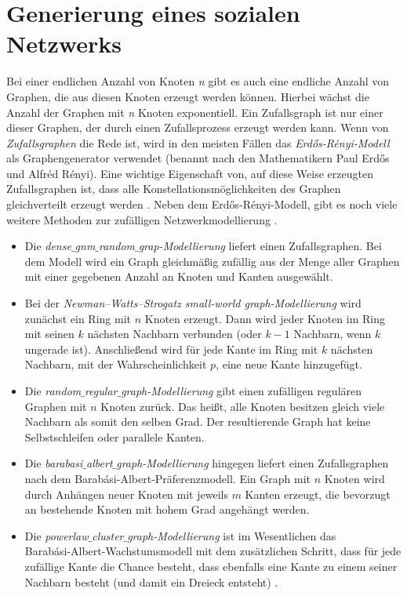 \section{Generierung eines sozialen Netzwerks} 
Bei einer endlichen Anzahl von Knoten \textit{n} gibt es auch eine endliche Anzahl von Graphen, die aus diesen Knoten erzeugt werden können. Hierbei wächst die Anzahl der Graphen mit \textit{n} Knoten exponentiell.
Ein Zufallsgraph ist nur einer dieser Graphen, der durch einen Zufallsprozess erzeugt werden kann.
Wenn von \textit{Zufallsgraphen} die Rede ist, wird in den meisten Fällen das \textit{Erdős-Rényi-Modell} als Graphengenerator verwendet (benannt nach den Mathematikern Paul Erdős und Alfréd Rényi). Eine wichtige Eigenschaft von, auf diese Weise erzeugten Zufallsgraphen ist, dass alle Konstellationsmöglichkeiten des Graphen gleichverteilt erzeugt werden \cite{Generators}.
Neben dem Erdős-Rényi-Modell, gibt es noch viele weitere Methoden zur zufälligen Netzwerkmodellierung \cite{Generators}.
\begin{itemize}
    \item Die \textit{dense$\_$gnm$\_$random$\_$grap-Modellierung} liefert einen Zufallsgraphen.
    Bei dem Modell wird ein Graph gleichmäßig zufällig aus der Menge aller Graphen mit einer gegebenen Anzahl an Knoten und Kanten ausgewählt.
    \item Bei der \textit{Newman–Watts–Strogatz small-world graph-Modellierung} wird zunächst ein Ring mit $n$ Knoten erzeugt. Dann wird jeder Knoten im Ring mit seinen $k$ nächsten Nachbarn verbunden (oder $k - 1$ Nachbarn, wenn $k$ ungerade ist). Anschließend wird für jede Kante im Ring mit $k$ nächsten Nachbarn, mit der Wahrscheinlichkeit $p$, eine neue Kante hinzugefügt.
    \item Die \textit{random$\_$regular$\_$graph-Modellierung} gibt einen zufälligen regulären Graphen mit $n$ Knoten zurück. Das heißt, alle Knoten besitzen gleich viele Nachbarn als somit den selben Grad.
    Der resultierende Graph hat keine Selbstschleifen oder parallele Kanten.
    \item Die \textit{barabasi$\_$albert$\_$graph-Modellierung} hingegen liefert einen Zufallsgraphen nach dem Barabási-Albert-Präferenzmodell.
    Ein Graph mit $n$ Knoten wird durch Anhängen neuer Knoten mit jeweils $m$ Kanten erzeugt, die bevorzugt an bestehende Knoten mit hohem Grad angehängt werden.
    \item Die \textit{powerlaw$\_$cluster$\_$graph-Modellierung} ist im Wesentlichen das\\ Barabási-Albert-Wachstumsmodell mit dem zusätzlichen Schritt, dass für jede zufällige Kante die Chance besteht, dass ebenfalls eine Kante zu einem seiner Nachbarn besteht (und damit ein Dreieck entsteht) \cite{Generators}.
\end{itemize}

